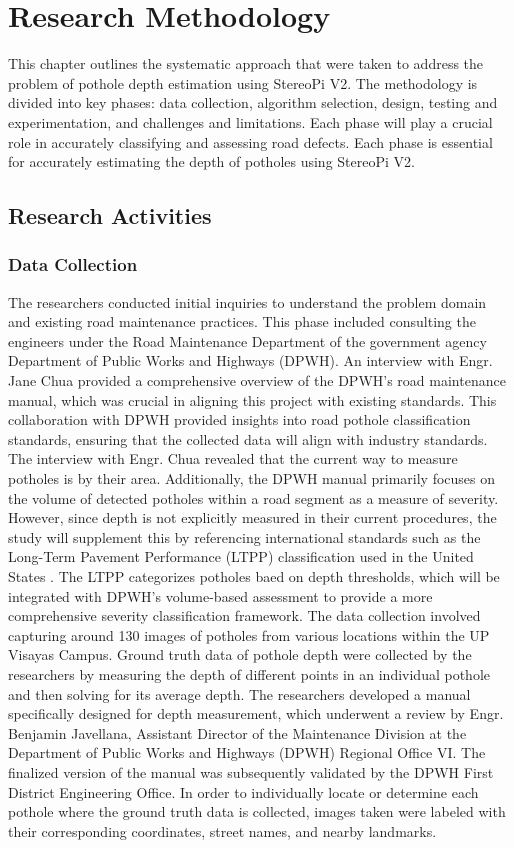 \chapter{Research Methodology}
This chapter outlines the systematic approach that were taken to address the problem of pothole depth estimation using StereoPi V2. The methodology is divided into key phases: data collection, algorithm selection, design, testing and experimentation, and challenges and limitations. Each phase will play a crucial role in accurately classifying and assessing road defects.  Each phase is essential for accurately estimating the depth of potholes using StereoPi V2. 

\section{ Research Activities}

\subsection{Data Collection}
The researchers conducted initial inquiries to understand the problem domain and existing road maintenance practices. This phase included consulting the engineers under the Road Maintenance Department of the government agency Department of Public Works and Highways (DPWH). An interview with Engr. Jane Chua provided a comprehensive overview of the DPWH's road maintenance manual, which was crucial in aligning this project with existing standards. This collaboration with DPWH provided insights into road pothole classification standards, ensuring that the collected data will align with industry standards. The interview with Engr. Chua revealed that the current way to measure potholes is by their area. Additionally, the DPWH manual primarily focuses on the volume of detected potholes within a road segment as a measure of severity. However, since depth is not explicitly measured in their current procedures, the study will supplement this by referencing international standards such as the Long-Term Pavement Performance (LTPP) classification used in the United States \cite{miller2014}. The LTPP categorizes potholes baed on depth thresholds, which will be integrated with DPWH’s volume-based assessment to provide a more comprehensive severity classification framework. The data collection involved capturing around 130 images of potholes from various locations within the UP Visayas Campus. Ground truth data of pothole depth were collected by the researchers by measuring the depth of different points in an individual pothole and then solving for its average depth. The researchers developed a manual specifically designed for depth measurement, which underwent a review by Engr. Benjamin Javellana, Assistant Director of the Maintenance Division at the Department of Public Works and Highways (DPWH) Regional Office VI. The finalized version of the manual was subsequently validated by the DPWH First District Engineering Office. In order to individually locate or determine each pothole where the ground truth data is collected, images taken were labeled with their corresponding coordinates, street names, and nearby landmarks.


